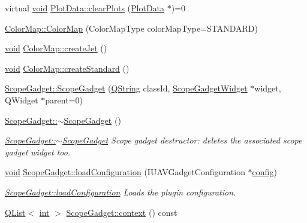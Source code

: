 \begin{DoxyCompactItemize}
\item 
virtual \hyperlink{group___u_a_v_objects_plugin_ga444cf2ff3f0ecbe028adce838d373f5c}{void} \hyperlink{group___scope_plugin_ga69868354ebe2ca7e39c8663d547c5935}{Plot\-Data\-::clear\-Plots} (\hyperlink{class_plot_data}{Plot\-Data} $\ast$)=0
\item 
\hyperlink{group___scope_plugin_ga161e07946c9ab58fd04048a781700ff6}{Color\-Map\-::\-Color\-Map} (Color\-Map\-Type color\-Map\-Type=S\-T\-A\-N\-D\-A\-R\-D)
\item 
\hyperlink{group___u_a_v_objects_plugin_ga444cf2ff3f0ecbe028adce838d373f5c}{void} \hyperlink{group___scope_plugin_ga040b747e27af88d72ffee08958e26e1c}{Color\-Map\-::create\-Jet} ()
\item 
\hyperlink{group___u_a_v_objects_plugin_ga444cf2ff3f0ecbe028adce838d373f5c}{void} \hyperlink{group___scope_plugin_ga1900e4d813aed6169f83d1d83c3746e3}{Color\-Map\-::create\-Standard} ()
\item 
\hyperlink{group___scope_plugin_ga3f75e488a9369b654162e789b9f7d4c8}{Scope\-Gadget\-::\-Scope\-Gadget} (\hyperlink{group___u_a_v_objects_plugin_gab9d252f49c333c94a72f97ce3105a32d}{Q\-String} class\-Id, \hyperlink{class_scope_gadget_widget}{Scope\-Gadget\-Widget} $\ast$widget, Q\-Widget $\ast$parent=0)
\item 
\hyperlink{group___scope_plugin_ga814c8fd9020778e2cb89a7ab8a49995b}{Scope\-Gadget\-::$\sim$\-Scope\-Gadget} ()
\begin{DoxyCompactList}\small\item\em \hyperlink{group___scope_plugin_ga814c8fd9020778e2cb89a7ab8a49995b}{Scope\-Gadget\-::$\sim$\-Scope\-Gadget} Scope gadget destructor\-: deletes the associated scope gadget widget too. \end{DoxyCompactList}\item 
\hyperlink{group___u_a_v_objects_plugin_ga444cf2ff3f0ecbe028adce838d373f5c}{void} \hyperlink{group___scope_plugin_ga34947ab35d8b4d37de1a1d70e32e2de5}{Scope\-Gadget\-::load\-Configuration} (I\-U\-A\-V\-Gadget\-Configuration $\ast$\hyperlink{deflate_8c_a4473b5227787415097004fd39f55185e}{config})
\begin{DoxyCompactList}\small\item\em \hyperlink{group___scope_plugin_ga34947ab35d8b4d37de1a1d70e32e2de5}{Scope\-Gadget\-::load\-Configuration} Loads the plugin configuration. \end{DoxyCompactList}\item 
\hyperlink{class_q_list}{Q\-List}$<$ \hyperlink{ioapi_8h_a787fa3cf048117ba7123753c1e74fcd6}{int} $>$ \hyperlink{group___scope_plugin_gad13cd805d94869e729a8eb14728e2551}{Scope\-Gadget\-::context} () const 

\end{DoxyCompactItemize}
